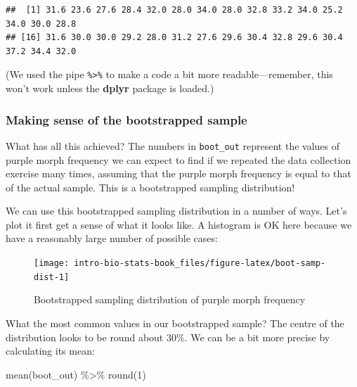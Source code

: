 \documentclass[
]{book}
\newenvironment{Shaded}{\begin{snugshade}}{\end{snugshade}}
\newcommand{\DecValTok}[1]{\textcolor[rgb]{0.00,0.00,0.81}{#1}}
\newcommand{\FunctionTok}[1]{\textcolor[rgb]{0.00,0.00,0.00}{#1}}
\newcommand{\NormalTok}[1]{#1}
\newcommand{\SpecialCharTok}[1]{\textcolor[rgb]{0.00,0.00,0.00}{#1}}
\begin{document}
\begin{verbatim}
##  [1] 31.6 23.6 27.6 28.4 32.0 28.0 34.0 28.0 32.8 33.2 34.0 25.2 34.0 30.0 28.8
## [16] 31.6 30.0 30.0 29.2 28.0 31.2 27.6 29.6 30.4 32.8 29.6 30.4 37.2 34.4 32.0
\end{verbatim}

(We used the pipe \texttt{\%\textgreater{}\%} to make a code a bit more readable---remember, this won't work unless the \textbf{dplyr} package is loaded.)

\hypertarget{making-sense-of-the-bootstrapped-sample}{%
\subsubsection*{Making sense of the bootstrapped sample}\label{making-sense-of-the-bootstrapped-sample}}

What has all this achieved? The numbers in \texttt{boot\_out} represent the values of purple morph frequency we can expect to find if we repeated the data collection exercise many times, assuming that the purple morph frequency is equal to that of the actual sample. This is a bootstrapped sampling distribution!

We can use this bootstrapped sampling distribution in a number of ways. Let's plot it first get a sense of what it looks like. A histogram is OK here because we have a reasonably large number of possible cases:

\begin{figure}

{\centering \texttt{[image: intro-bio-stats-book\_files/figure-latex/boot-samp-dist-1]} 

}

\caption{Bootstrapped sampling distribution of purple morph frequency}\label{fig:boot-samp-dist}
\end{figure}

What the most common values in our bootstrapped sample? The centre of the distribution looks to be round about 30\%. We can be a bit more precise by calculating its mean:

\begin{Shaded}
\begin{Highlighting}[]
\FunctionTok{mean}\NormalTok{(boot\_out) }\SpecialCharTok{\%\textgreater{}\%} \FunctionTok{round}\NormalTok{(}\DecValTok{1}\NormalTok{)}
\end{Highlighting}
\end{Shaded}
\end{document}
